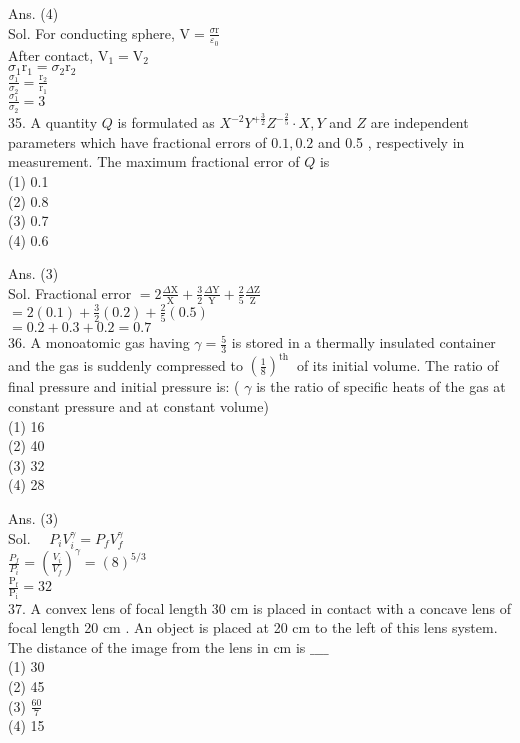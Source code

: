 \documentclass[10pt]{article}
\begin{document}
Ans. (4)\\
Sol. For conducting sphere, \(\mathrm{V}=\frac{\sigma \mathrm{r}}{\varepsilon_{0}}\)\\
After contact, \(\mathrm{V}_{1}=\mathrm{V}_{2}\)\\
\(\sigma_{1} \mathrm{r}_{1}=\sigma_{2} \mathrm{r}_{2}\)\\
\(\frac{\sigma_{1}}{\sigma_{2}}=\frac{\mathrm{r}_{2}}{\mathrm{r}_{1}}\)\\
\(\frac{\sigma_{1}}{\sigma_{2}}=3\)\\
35. A quantity \(Q\) is formulated as \(X^{-2} Y^{+\frac{3}{2}} Z^{-\frac{2}{5}} \cdot X, Y\) and \(Z\) are independent parameters which have fractional errors of \(0.1,0.2\) and 0.5 , respectively in measurement. The maximum fractional error of \(Q\) is\\
(1) 0.1\\
(2) 0.8\\
(3) 0.7\\
(4) 0.6

Ans. (3)\\
Sol. Fractional error \(=2 \frac{\Delta \mathrm{X}}{\mathrm{X}}+\frac{3}{2} \frac{\Delta \mathrm{Y}}{\mathrm{Y}}+\frac{2}{5} \frac{\Delta \mathrm{Z}}{\mathrm{Z}}\)\\
\(=2(0.1)+\frac{3}{2}(0.2)+\frac{2}{5}(0.5)\)\\
\(=0.2+0.3+0.2=0.7\)\\
36. A monoatomic gas having \(\gamma=\frac{5}{3}\) is stored in a thermally insulated container and the gas is suddenly compressed to \(\left(\frac{1}{8}\right)^{\text {th }}\) of its initial volume. The ratio of final pressure and initial pressure is: ( \(\gamma\) is the ratio of specific heats of the gas at constant pressure and at constant volume)\\
(1) 16\\
(2) 40\\
(3) 32\\
(4) 28

Ans. (3)\\
Sol. \(\quad P_{i} V_{i}^{\gamma}=P_{f} V_{f}^{\gamma}\)\\
\(\frac{P_{f}}{P_{i}}=\left(\frac{V_{i}}{V_{f}}\right)^{\gamma}=(8)^{5 / 3}\)\\
\(\frac{\mathrm{P}_{\mathrm{f}}}{\mathrm{P}_{\mathrm{i}}}=32\)\\
37. A convex lens of focal length 30 cm is placed in contact with a concave lens of focal length 20 cm . An object is placed at 20 cm to the left of this lens system. The distance of the image from the lens in cm is \(\_\_\_\_\)\\
(1) 30\\
(2) 45\\
(3) \(\frac{60}{7}\)\\
(4) 15
\end{document}
